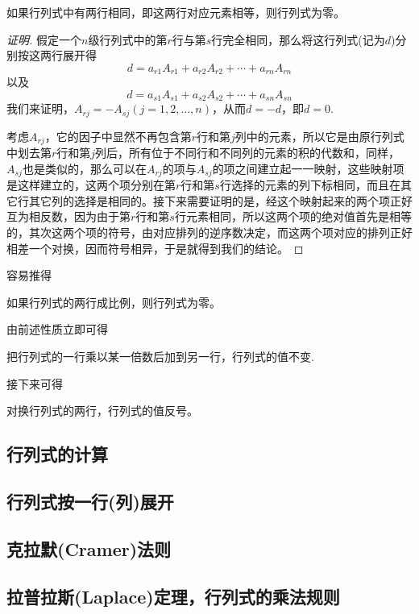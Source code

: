 \begin{property}
    如果行列式中有两行相同，即这两行对应元素相等，则行列式为零。
\end{property}

\begin{proof}[证明]
  假定一个$n$级行列式中的第$r$行与第$s$行完全相同，那么将这行列式(记为$d$)分别按这两行展开得
  \[ d = a_{r1}A_{r1}+a_{r2}A_{r2}+\cdots+a_{rn}A_{rn} \]
  以及
  \[ d = a_{s1}A_{s1}+a_{s2}A_{s2}+\cdots+a_{sn}A_{sn} \]
  我们来证明，$A_{rj}=-A_{sj}(j=1,2,\ldots,n)$，从而$d=-d$，即$d=0$.

  考虑$A_{rj}$，它的因子中显然不再包含第$r$行和第$j$列中的元素，所以它是由原行列式中划去第$r$行和第$j$列后，所有位于不同行和不同列的元素的积的代数和，同样，$A_{sj}$也是类似的，那么可以在$A_{rj}$的项与$A_{sj}$的项之间建立起一一映射，这些映射项是这样建立的，这两个项分别在第$r$行和第$s$行选择的元素的列下标相同，而且在其它行其它列的选择是相同的。接下来需要证明的是，经这个映射起来的两个项正好互为相反数，因为由于第$r$行和第$s$行元素相同，所以这两个项的绝对值首先是相等的，其次这两个项的符号，由对应排列的逆序数决定，而这两个项对应的排列正好相差一个对换，因而符号相异，于是就得到我们的结论。
\end{proof}

容易推得
\begin{inference}
  如果行列式的两行成比例，则行列式为零。
\end{inference}

由前述性质立即可得
\begin{property}
  把行列式的一行乘以某一倍数后加到另一行，行列式的值不变.
\end{property}

接下来可得
\begin{property}
  对换行列式的两行，行列式的值反号。
\end{property}

\subsection{行列式的计算}
\label{sec:computition-of-determinant}

\subsection{行列式按一行(列)展开}
\label{sec:determinant-expand-by-row-or-colume}

\subsection{克拉默(Cramer)法则}
\label{sec:cramer-rule}

\subsection{拉普拉斯(Laplace)定理，行列式的乘法规则}
\label{sec:laplace-theorem-of-determinant}





